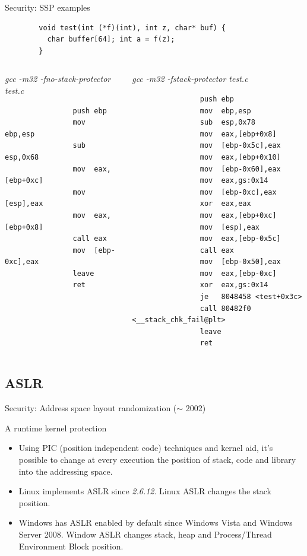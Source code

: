 \begin{frame}{Security: SSP examples}
	\ccode
	\begin{lstlisting}
		void test(int (*f)(int), int z, char* buf) {
		  char buffer[64]; int a = f(z);
		}
	\end{lstlisting}
	\vspace{-1cm}
	\begin{columns}[T]
		\begin{column}{.5\textwidth}
			{\small \emph{\alert{gcc -m32 -fno-stack-protector test.c}}}
			\acodesmall
			\begin{lstlisting}
				push ebp
				mov  ebp,esp
				sub  esp,0x68
				mov  eax,[ebp+0xc]
				mov  [esp],eax
				mov  eax,[ebp+0x8]
				call eax
				mov  [ebp-0xc],eax
				leave
				ret
			\end{lstlisting}
		\end{column}
		\begin{column}{.5\textwidth}
			{\small \emph{\alert{gcc -m32 -fstack-protector test.c}}}
			\acodesmall
			\begin{lstlisting}
				push ebp
				mov  ebp,esp
				sub  esp,0x78
				mov  eax,[ebp+0x8]
				mov  [ebp-0x5c],eax
				mov  eax,[ebp+0x10]
				mov  [ebp-0x60],eax
				mov  eax,gs:0x14
				mov  [ebp-0xc],eax
				xor  eax,eax
				mov  eax,[ebp+0xc]
				mov  [esp],eax
				mov  eax,[ebp-0x5c]
				call eax
				mov  [ebp-0x50],eax
				mov  eax,[ebp-0xc]
				xor  eax,gs:0x14
				je   8048458 <test+0x3c>
				call 80482f0 <__stack_chk_fail@plt>
				leave
				ret
			\end{lstlisting}
		\end{column}
	\end{columns}
\end{frame}

\subsection{ASLR}
\begin{frame}[fragile]{Security: Address space layout randomization ($\sim$ 2002)}
	\begin{block}{A runtime kernel protection}
		\begin{itemize}
			\item Using PIC (position independent code) techniques and kernel aid,
				it's possible to change at every execution the position of stack, code
				and library into the addressing space.
			\item Linux implements ASLR since \emph{2.6.12}. Linux ASLR changes the
				stack position.
			\item Windows has ASLR enabled by default since Windows Vista and Windows
				Server 2008. Window ASLR changes stack, heap and Process/Thread
				Environment Block position.
		\end{itemize}
	\end{block}
\end{frame}

